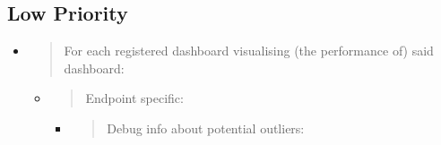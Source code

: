 \hypertarget{low-priority}{%
\subsection{Low Priority}\label{low-priority}}

\begin{itemize}
\item
  \begin{quote}
  For each registered dashboard visualising (the performance of) said
  dashboard:
  \end{quote}

  \begin{itemize}
  \item
    \begin{quote}
    Endpoint specific:
    \end{quote}

    \begin{itemize}
    \item
      \begin{quote}
      Debug info about potential outliers:
      \end{quote}


\end{itemize}
\end{itemize}
\end{itemize}
